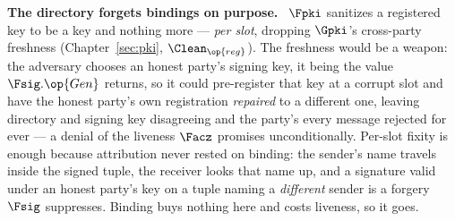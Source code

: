 \documentclass[10pt,oneside,openany]{book}
\newcommand{\heading}[1]{\medskip\par\noindent\textcolor{accent}{\textbf{#1.}}\ }
\theoremstyle{accentdef}
\theoremstyle{accentplain}
\begin{document}
\heading{The directory forgets bindings on purpose} $\Fpki$ sanitizes a registered key to be a
key and nothing more --- \emph{per slot}, dropping $\Gpki$'s cross-party freshness
(Chapter~\ref{sec:pki}, $\Clean_{\op{reg}}$). The freshness would be a weapon: the adversary
chooses an honest party's signing key, it being the value $\Fsig.\op{Gen}$ returns, so it could
pre-register that key at a corrupt slot and have the honest party's own registration
\emph{repaired} to a different one, leaving directory and signing key disagreeing and the party's
every message rejected for ever --- a denial of the liveness $\Facz$ promises unconditionally.
Per-slot fixity is enough because attribution never rested on binding: the sender's name travels
inside the signed tuple, the receiver looks that name up, and a signature valid under an honest
party's key on a tuple naming a \emph{different} sender is a forgery $\Fsig$ suppresses. Binding
buys nothing here and costs liveness, so it goes.
\end{document}
